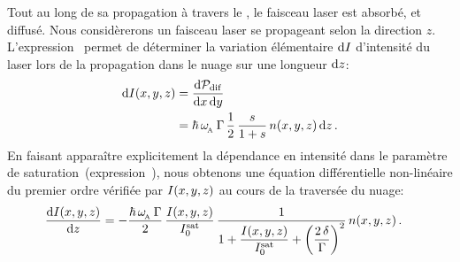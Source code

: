 Tout au long de sa propagation à travers le \n, le faisceau laser est absorbé, et diffusé. Nous considèrerons un faisceau laser se propageant selon la direction $z$. L'expression~ permet de déterminer la variation élémentaire ${\mathrm{d} {I}}$ d'intensité du laser lors de la propagation dans le nuage sur une longueur ${{\mathrm{d} z}}$:
\begin{align}
	\Diff{\Ixyz}
	& = \frac{\Diff{\Pdif}}{\dx\,\dy} 
	\nonumber\\
	& = \hbar\,\pulsReso\, \pulsSpont \, \frac{1}{2} 
	\, \frac{\sat}{1+\sat}
	\, \densxyz\,\dz 
	\pointformule
	\label{eq:dIabsGenerale}
\end{align}
En faisant apparaître explicitement la dépendance en intensité dans le paramètre de saturation~(expression~), nous obtenons une équation différentielle non-linéaire du premier ordre vérifiée par ${{I}(x,y,z)}$ au cours de la traversée du nuage:
\begin{align}
	\Derive{\Ixyz}{z}
	& = - \frac{\hbar\,\pulsReso\, \pulsSpont}{2} 
	\, \IsurIsatxyz 
	\, \frac{1}{1 + \IsurIsatxyz + \left(\dfrac{2\,\desac}{\pulsSpont}\right)^2}
	\, \densxyz 
	\pointformule
	\label{eq:EqDiffAbsGenerale}
\end{align}

